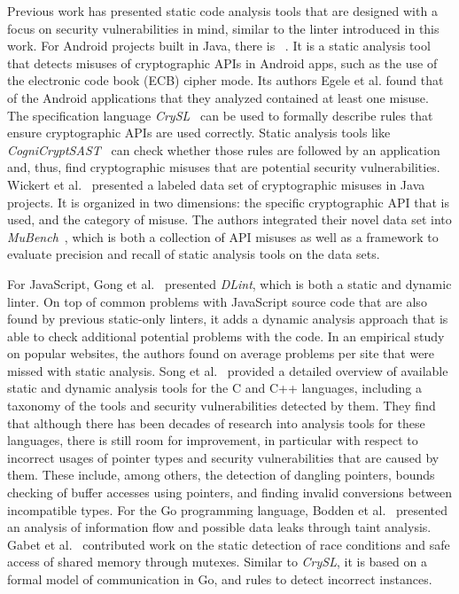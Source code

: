 Previous work has presented static code analysis tools that are designed with a focus on security vulnerabilities in
mind, similar to the \toolSafer{} linter introduced in this work.
For Android projects built in Java, there is \toolCryptolint{}~\cite{egele2013}.
It is a static analysis tool that detects misuses of cryptographic \acrshort{API}s in Android apps, such as the use of
the electronic code book (\acrshort{ECB}) cipher mode.
Its authors Egele et al. found that  of the  Android applications that they analyzed
contained at least one misuse.
The specification language \textit{CrySL}~\cite{kruger2018} can be used to formally describe rules that ensure
cryptographic \acrshort{API}s are used correctly.
Static analysis tools like \textit{CogniCryptSAST}~\cite{kruger2017} can check whether those rules are followed by an
application and, thus, find cryptographic misuses that are potential security vulnerabilities.
Wickert et al.~\cite{wickert2019} presented a labeled data set of  cryptographic misuses in Java projects.
It is organized in two dimensions: the specific cryptographic \acrshort{API} that is used, and the category of misuse.
The authors integrated their novel data set into \textit{MuBench}~\cite{amann2016}, which is both a collection of
\acrshort{API} misuses as well as a framework to evaluate precision and recall of static analysis tools on the data
sets.

For JavaScript, Gong et al.~\cite{gong2015} presented \textit{DLint}, which is both a static and dynamic linter.
On top of common problems with JavaScript source code that are also found by previous static-only linters, it adds a
dynamic analysis approach that is able to check  additional potential problems with the code.
In an empirical study on  popular websites, the authors found on average  problems
per site that were missed with static analysis.
Song et al.~\cite{song2019} provided a detailed overview of available static and dynamic analysis tools for the C and C++
languages, including a taxonomy of the tools and security vulnerabilities detected by them.
They find that although there has been decades of research into analysis tools for these languages, there is still room
for improvement, in particular with respect to incorrect usages of pointer types and security vulnerabilities that are
caused by them.
These include, among others, the detection of dangling pointers, bounds checking of buffer accesses using pointers, and
finding invalid conversions between incompatible types.
For the Go programming language, Bodden et al.~\cite{bodden2016} presented an analysis of information flow and possible
data leaks through taint analysis.
Gabet et al.~\cite{gabet2020} contributed work on the static detection of race conditions and safe access of shared
memory through mutexes.
Similar to \textit{CrySL}, it is based on a formal model of communication in Go, and rules to detect incorrect instances.

